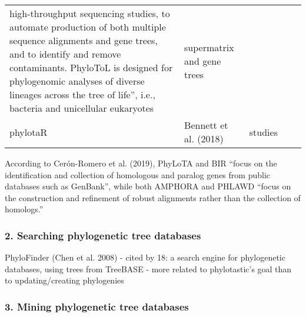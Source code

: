 \documentclass[draft]{ametsoc}
\begin{document}
\begin{longtable}[]{@{}llccc@{}}
\begin{minipage}[t]{0.20\columnwidth}
high-throughput sequencing studies, to automate production of both
multiple sequence alignments and gene trees, and to identify and remove
contaminants. PhyloToL is designed for phylogenomic analyses of diverse
lineages across the tree of life'', i.e., bacteria and unicellular
eukaryotes\strut
\end{minipage} & \begin{minipage}[t]{0.20\columnwidth}\centering
supermatrix and gene trees\strut
\end{minipage}\tabularnewline
\begin{minipage}[t]{0.12\columnwidth}\raggedright
phylotaR\strut
\end{minipage} & \begin{minipage}[t]{0.15\columnwidth}\raggedright
Bennett et al. (2018)\strut
\end{minipage} & \begin{minipage}[t]{0.20\columnwidth}\centering
studies\strut
\end{minipage} & \begin{minipage}[t]{0.20\columnwidth}\centering
\strut
\end{minipage} & \begin{minipage}[t]{0.20\columnwidth}\centering
\strut
\end{minipage}\tabularnewline
\bottomrule
\end{longtable}

According to Cerón-Romero et al. (2019), PhyLoTA and BIR ``focus on the
identification and collection of homologous and paralog genes from
public databases such as GenBank'', while both AMPHORA and PHLAWD
``focus on the construction and refinement of robust alignments rather
than the collection of homologs.''

\hypertarget{searching-phylogenetic-tree-databases}{%
\subsubsection{2. Searching phylogenetic tree
databases}\label{searching-phylogenetic-tree-databases}}

PhyloFinder (Chen et al. 2008) - cited by 18: a search engine for
phylogenetic databases, using trees from TreeBASE - more related to
phylotastic's goal than to updating/creating phylogenies

\hypertarget{mining-phylogenetic-tree-databases}{%
\subsubsection{3. Mining phylogenetic tree
databases}\label{mining-phylogenetic-tree-databases}}
\end{document}

